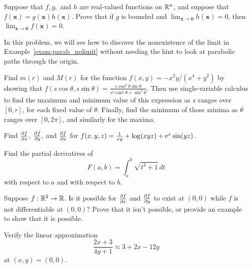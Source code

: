 \documentclass{watsonbook}
\begin{document}
\begin{aexercise}
  Suppose that $f,g,$ and $h$ are real-valued functions on $\mathbb{R}^n$, and
  suppose that $f(\mathbf{x}) = g(\mathbf{x})h(\mathbf{x})$. Prove
  that if $g$ is bounded and
  $\lim_{\mathbf{x}\to \mathbf{0}}h(\mathbf{x}) = 0$, then
  $\lim_{\mathbf{x}\to \mathbf{0}}f(\mathbf{x}) = 0$.
\end{aexercise}

\begin{aexercise}
  In this problem, we will see how to discover the nonexistence of the
  limit in Example~\ref{exam:parab_nolimit} without needing the hint
  to look at parabolic paths through the origin.

  Find $m(r)$ and $M(r)$ for the function $f(x,y) = -x^2y/(x^4 + y^2)$
  by showing that
  $f(s\cos \theta, s\sin \theta) = \frac{s \cos^{2}{\theta}
    \sin{\theta}}{s^{2} \cos^{4}{\theta} + \sin^{2}{\theta}}$. Then
  use single-variable calculus to find the maximum and minimum value
  of this expression as $s$ ranges over $[0,r]$, for each fixed value
  of $\theta$. Finally, find the minimum of those minima as
  $\theta$ ranges over $[0,2\pi]$, and similarly for the maxima. 
\end{aexercise}



\begin{aexercise}
  Find $\frac{\partial f}{\partial x}$, $\frac{\partial f}{\partial y}$, and $\frac{\partial f}{\partial z}$ for
  $f(x,y,z) = \frac{1}{xy} + \log(xyz) + \mathrm{e}^x\sin(y z) $.
\end{aexercise}

\begin{aexercise}
  Find the partial derivatives of
  \[
    F(a,b) = \int_a^b \sqrt{t^3+1}\,dt
  \]
  with respect to $a$ and with respect to $b$.
\end{aexercise}

\begin{aexercise}
  Suppose $f:\mathbb{R}^2 \to \mathbb{R}$. Is it possible for $\frac{\partial f}{\partial x}$ and
  $\frac{\partial f}{\partial y}$ to exist at $(0,0)$ while $f$ is not differentiable at
  $(0,0)$?  Prove that it isn't possible, or provide an example to
  show that it is possible.
\end{aexercise}


\begin{aexercise}
  Verify the linear approximation
  \[
    \frac{2x+3}{4y+1} \approx 3 + 2x - 12y
  \]
  at $(x,y) = (0,0)$.
\end{aexercise}
\end{document}

